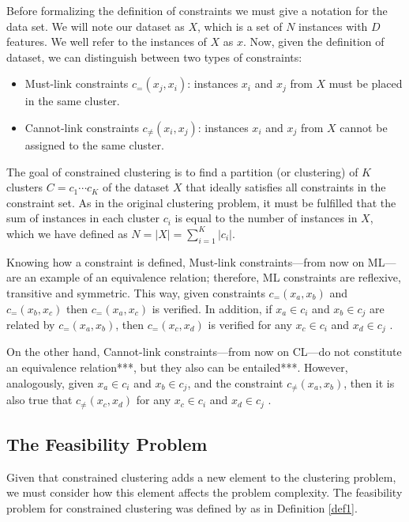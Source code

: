 \documentclass[review]{elsarticle}
\begin{document}
Before formalizing the definition of constraints we must give a notation for the data set. We will note our dataset as $X$, which is a set of $N$ instances with $D$ features. We well refer to the instances of $X$ as $x$. Now, given the definition of dataset, we can distinguish between two types of constraints:

\begin{itemize}

	\item Must-link constraints $c_=(x_j,x_i)$: instances $x_i$ and $x_j$ from $X$ must be placed in the same cluster.

	\item Cannot-link constraints $c_{\neq}(x_i,x_j)$: instances $x_i$ and $x_j$ from $X$ cannot be assigned to the same cluster.

\end{itemize}

The goal of constrained clustering is to find a partition (or clustering) of $K$ clusters $C = {c_1 \cdots c_K}$ of the dataset $X$ that ideally satisfies all constraints in the constraint set. As in the original clustering problem, it must be fulfilled that the sum of instances in each cluster $c_i$ is equal to the number of instances in $X$, which we have defined as $N = |X| = \sum_{i = 1}^{K} |c_i|$.

Knowing how a constraint is defined, Must-link constraints---from now on ML---are an example of an equivalence relation; therefore, ML constraints are reflexive, transitive and symmetric. This way, given constraints $c_=(x_a,x_b)$ and $c_=(x_b,x_c)$ then $c_=(x_a,x_c)$ is verified. In addition, if $x_a \in c_i$ and $x_b \in c_j$ are related by $c_=(x_a,x_b)$, then $c_=(x_c,x_d)$ is verified for any $x_c \in c_i$ and $x_d \in c_j$ \cite{xu2013improving}\cite{davidson2007survey}.

On the other hand, Cannot-link constraints---from now on CL---do not constitute an equivalence relation***, but they also can be entailed***. However, analogously, given $x_a \in c_i$ and $x_b \in c_j$, and the constraint $c_{\neq}(x_a,x_b)$, then it is also true that $c_{\neq}(x_c,x_d)$ for any $x_c \in c_i$ and $x_d \in c_j$ \cite{davidson2007survey}.

\subsection{The Feasibility Problem}

Given that constrained clustering adds a new element to the clustering problem, we must consider how this element affects the problem complexity. The feasibility problem for constrained clustering was defined by \cite{davidson2005clustering} as in Definition \ref{def1}.
\end{document}
